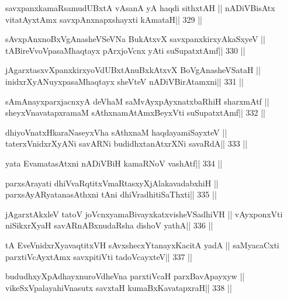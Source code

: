 \begin{shl}
savxpanxkamaRsamudUBxtA vAsanA yA haqdi sithxtAH ||
nADiVBisAtx vitatAyx\s\s tAmx savxpAnxnapxshayxti  kAmataH\hfill || 329 ||
\end{shl}

\begin{shl}
sAvxpAnxnoBxVgAnasheVSeVNa BukAtxvX savxpanxkirxyAkaSxyeV ||
tABireVvoVpasaMhaqtayx pArxjoVcnx yAti suSupatxtAmf\hfill || 330 ||
\end{shl}

\begin{shl}
jAgarxtasxvXpanxkirxyoVdUBxtAnuBxkAtxvX BoVgAnasheVSataH ||
inidxrXyANuyxpasaMhaqtayx sheVteV nADiVBirAtamxni\hfill || 331 ||
\end{shl}

\begin{shl}
sAmAnayxparxjacnxyA deVhaM saMvAyxpAyxnatxbaRhiH sharxmAtf ||
sheyxVnavatapxramaM sAthxnamAtAmx\s BeyxVti suSupatxtAmf\hfill || 332 ||
\end{shl}

\begin{shl}
dhiyoV\s natxHkaraNaseyxVha sAthxnaM haqdayamiSayxteV ||
taterxVnidxrXyANi savARNi budidhxtanAtxrXNi savaRdA\hfill || 333 ||
\end{shl}

\begin{shl}
yata EvamatasAtxni nADiVBiH kamaRNoV vashAtf\hfill || 334 ||
\end{shl}

\begin{shl}
parxsArayati dhiVvaRqtitxVmaRtasxyXjAlakavadabxhiH ||
parxsAyAR\s\s yatanasAthxni tAni dhiVradhitiSaThxti\hfill || 335 ||
\end{shl}

\begin{shl}
jAgarxtAkxleV tatoV joVcnx\s yamaBivayxkatxvisheVSadhiVH ||
vAyxponxVti niSikxrXyaH savARnABxnudaRsha dishoV yathA\hfill || 336 ||
\end{shl}

\begin{shl}
tA EveVnidxrXyavaqtitxVH sAvxshecxYtanayxKacitA yadA ||
saMyacaCxti parxtiVcAyxtAmx savxpitiVti tadoVcayxteV\hfill || 337 ||
\end{shl}

\begin{shl}
bududhxyXpAdhayxnuroVdheVna parxtiVcaH parxBavApayxyw ||
vikeSxVpalayahiVnasutx savxtaH kumaBxKavatapxraH\hfill || 338 ||
\end{shl}

